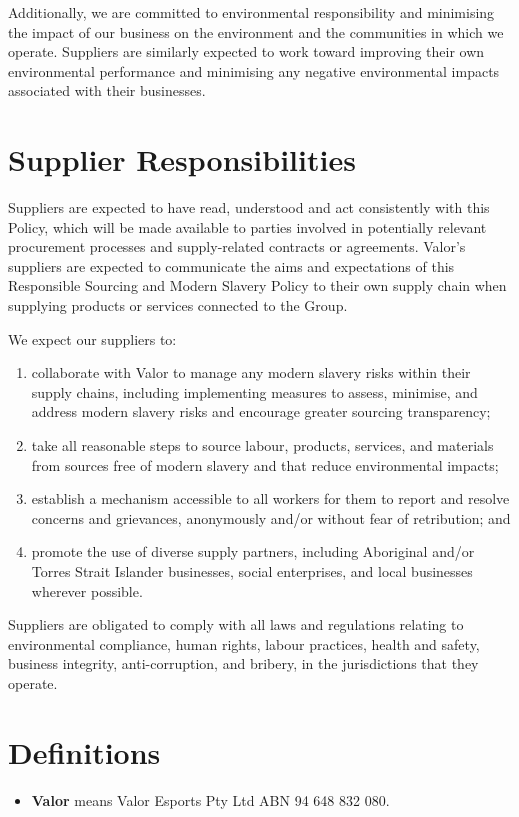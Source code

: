 \documentclass[10pt]{article}
\begin{document}
Additionally, we are committed to environmental responsibility and minimising the impact of our business on the environment and the communities in which we operate. Suppliers are similarly expected to work toward improving their own environmental performance and minimising any negative environmental impacts associated with their businesses.


\section{Supplier Responsibilities}
\label{supplierresponsibilities}

Suppliers are expected to have read, understood and act consistently with this Policy, which will be made available to parties involved in potentially relevant procurement processes and supply-related contracts or agreements. Valor's suppliers are expected to communicate the aims and expectations of this Responsible Sourcing and Modern Slavery Policy to their own supply chain when supplying products or services connected to the Group.

We expect our suppliers to:
\begin{enumerate}[(1)]
	\item collaborate with Valor to manage any modern slavery risks within their supply chains, including implementing measures to assess, minimise, and address modern slavery risks and encourage greater sourcing transparency;
	\item take all reasonable steps to source labour, products, services, and materials from sources free of modern slavery and that reduce environmental impacts;
	\item establish a mechanism accessible to all workers for them to report and resolve concerns and grievances, anonymously and/or without fear of retribution; and
	\item promote the use of diverse supply partners, including Aboriginal and/or Torres Strait Islander businesses, social enterprises, and local businesses wherever possible.
\end{enumerate}

Suppliers are obligated to comply with all laws and regulations relating to environmental compliance, human rights, labour practices, health and safety, business integrity, anti-corruption, and bribery, in the jurisdictions that they operate.


\section{Definitions}
\begin{itemize}
	\item[]	
	\textbf{Valor} means Valor Esports Pty Ltd ABN 94 648 832 080.
\end{itemize}
\end{document}

